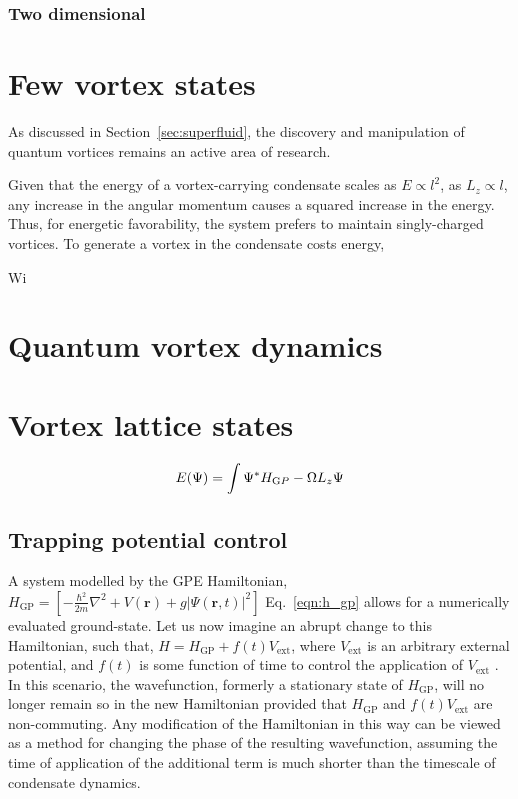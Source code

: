 {\subsubsection{Two dimensional}



\section{Few vortex states}
As discussed in Section~\ref{sec:superfluid}, the discovery and manipulation of quantum vortices remains an active area of research.


Given that the energy of a vortex-carrying condensate scales as $E\propto l^2$, as $L_z \propto l$, any increase in the angular momentum causes a squared increase in the energy. Thus, for energetic favorability, the system prefers to maintain singly-charged vortices. To generate a vortex in the condensate costs energy,

Wi

\section{Quantum vortex dynamics}



\section{Vortex lattice states}
    \begin{equation}
        E(\Psi) = \int \Psi^{*} H_{\text GP} -\Omega L_z \Psi
    \end{equation}





\subsection{Trapping potential control}
A system modelled by the GPE Hamiltonian, $H_{\textrm{GP}} = \left[-\frac{\hbar^2}{2m}\nabla^2 + V(\textbf{r}) + g\vert\Psi(\textbf{r},t)\vert^2 \right]$ Eq.~\ref{eqn:h_gp} allows for a numerically evaluated ground-state. Let us now imagine an abrupt change to this Hamiltonian, such that, $H = H_{\textrm{GP}} + f(t) V_{\textrm{ext}}$, where  $V_{\textrm{ext}}$ is an arbitrary external potential, and $f(t)$ is some function of time to control the application of $V_{\textrm{ext}}$ . In this scenario, the wavefunction, formerly a stationary state of $H_{\textrm{GP}}$, will no longer remain so in the new Hamiltonian provided that $H_{\textrm{GP}} $ and $f(t) V_{\textrm{ext}}$ are non-commuting. Any modification of the Hamiltonian in this way can be viewed as a method for changing the phase of the resulting wavefunction, assuming the time of application of the additional term is much shorter than the timescale of condensate dynamics.

}
